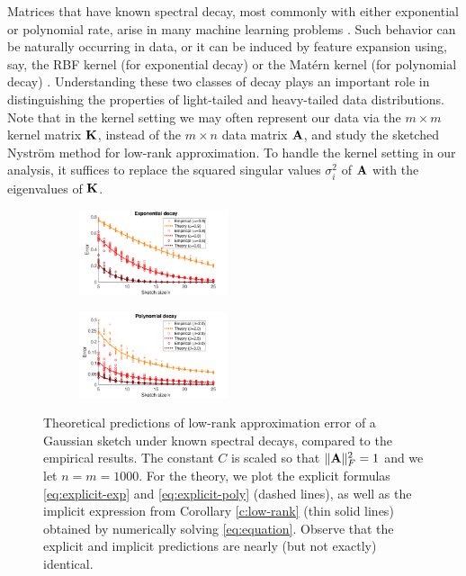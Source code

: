 \documentclass[thesis.tex]{subfiles}
\begin{document}
Matrices that have known spectral decay, most commonly with either
exponential or polynomial rate, arise in many machine
learning problems \cite{randomized-newton}. Such behavior can be naturally
occurring in data, or it can be induced by feature expansion using, say, the
RBF kernel (for exponential decay) \cite{Santa97Gaussianregression} or the
Mat\'ern kernel (for polynomial decay) \cite{RasmussenWilliams06}. Understanding these
two classes of decay plays an important role in distinguishing the
properties of light-tailed and heavy-tailed data distributions.
Note that in the kernel setting we may often represent our data via
the $m\times m$ kernel matrix $\mathbf K$, instead of the $m\times n$ data
matrix $\mathbf A$, and study the sketched Nystr\"om method
\cite{revisiting-nystrom} for low-rank approximation. To handle 
the kernel setting in our analysis, it suffices to replace the squared singular
values $\sigma_i^2$ of $\mathbf A$ with the eigenvalues of $\mathbf K$.
\begin{figure}[t]
\centering
    \begin{subfigure}{0.49\textwidth}%
    \includegraphics[width=0.48\textwidth]{explicit_exp}
    \end{subfigure}
\hfill
    \begin{subfigure}{0.49\textwidth}%
      \includegraphics[width=0.48\textwidth]{explicit_poly}
    \end{subfigure}
\caption{
Theoretical predictions of low-rank approximation error of a Gaussian
sketch under known spectral decays, compared to the empirical results.
The constant $C$ is scaled so that $\|\mathbf A\|_F^2=1$ and we let
$n=m=1000$. For the theory, we plot the explicit formulas
\eqref{eq:explicit-exp} and \eqref{eq:explicit-poly} (dashed lines),
as well as the implicit expression from Corollary \ref{c:low-rank}
(thin solid lines) obtained by numerically solving
\eqref{eq:equation}. Observe that the explicit and implicit
predictions are nearly (but not exactly) identical.
}
\label{f:explicit}
\end{figure}
\end{document}
